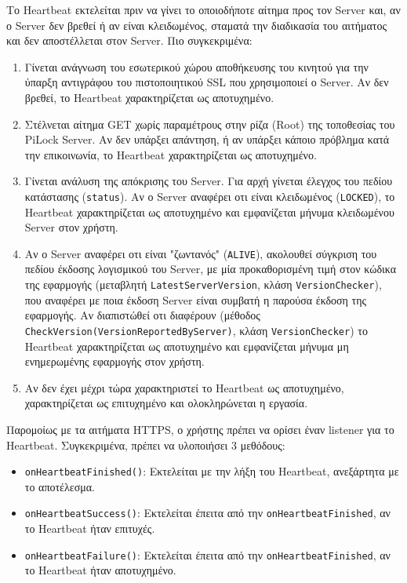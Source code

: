 	Το Heartbeat εκτελείται πριν να γίνει το οποιοδήποτε αίτημα προς τον Server και, αν ο Server δεν βρεθεί ή αν είναι κλειδωμένος, σταματά την διαδικασία του αιτήματος και δεν αποστέλλεται στον Server. Πιο συγκεκριμένα:
	\begin{enumerate}
		\item Γίνεται ανάγνωση του εσωτερικού χώρου αποθήκευσης του κινητού για την ύπαρξη αντιγράφου του πιστοποιητικού SSL που χρησιμοποιεί ο Server. Αν δεν βρεθεί, το Heartbeat χαρακτηρίζεται ως αποτυχημένο.
		\item Στέλνεται αίτημα GET χωρίς παραμέτρους στην ρίζα (Root) της τοποθεσίας του PiLock Server. Αν δεν υπάρξει απάντηση, ή αν υπάρξει κάποιο πρόβλημα κατά την επικοινωνία, το Heartbeat χαρακτηρίζεται ως αποτυχημένο.
		\item Γίνεται ανάλυση της απόκρισης του Server. Για αρχή γίνεται έλεγχος του πεδίου κατάστασης (\verb|status|). Αν ο Server αναφέρει οτι είναι κλειδωμένος (\verb|LOCKED|), το Heartbeat χαρακτηρίζεται ως αποτυχημένο και εμφανίζεται μήνυμα κλειδωμένου Server στον χρήστη. 
		\item Αν ο Server αναφέρει οτι είναι "ζωντανός" (\verb|ALIVE|), ακολουθεί σύγκριση του πεδίου έκδοσης λογισμικού του Server, με μία προκαθορισμένη τιμή στον κώδικα της εφαρμογής (μεταβλητή \verb|LatestServerVersion|, κλάση \verb|VersionChecker|), που αναφέρει με ποια έκδοση Server είναι συμβατή η παρούσα έκδοση της εφαρμογής. Αν διαπιστώθεί οτι διαφέρουν (μέθοδος \verb|CheckVersion(VersionReportedByServer)|, κλάση \verb|VersionChecker|) το Heartbeat χαρακτηρίζεται ως αποτυχημένο και εμφανίζεται μήνυμα μη ενημερωμένης εφαρμογής στον χρήστη. 
		\item Αν δεν έχει μέχρι τώρα χαρακτηριστεί το Heartbeat ως αποτυχημένο, χαρακτηρίζεται ως επιτυχημένο και ολοκληρώνεται η εργασία.
	\end{enumerate}

	Παρομοίως με τα αιτήματα HTTPS, ο χρήστης πρέπει να ορίσει έναν listener για το Heartbeat. Συγκεκριμένα, πρέπει να υλοποιήσει 3 μεθόδους:

	\begin{itemize}
		\item \verb|onHeartbeatFinished()|: Εκτελείται με την λήξη του Heartbeat, ανεξάρτητα με το αποτέλεσμα.
		\item \verb|onHeartbeatSuccess()|: Εκτελείται έπειτα από την \verb|onHeartbeatFinished|, αν το Heartbeat ήταν επιτυχές.
		\item \verb|onHeartbeatFailure()|: Εκτελείται έπειτα από την \verb|onHeartbeatFinished|, αν το Heartbeat ήταν αποτυχημένο.
	\end{itemize}


